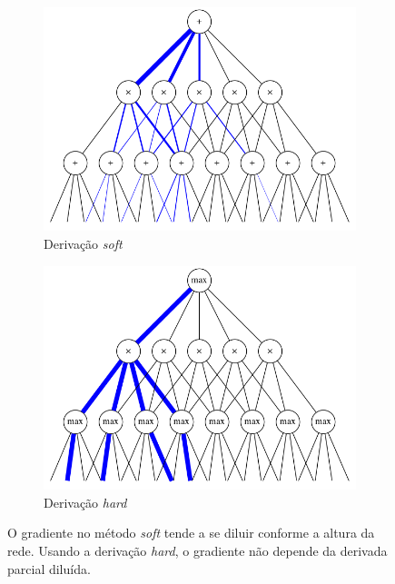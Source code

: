 \documentclass[12pt]{article}
\theoremstyle{plain}
\numberwithin{equation}{section}
\begin{document}
\begin{figure}[h]
  \begin{subfigure}{.5\textwidth}
    \centering\includegraphics[scale=0.375]{graphs/softgrad.png}
    \caption{Derivação \textit{soft}}
  \end{subfigure}
  \begin{subfigure}{.5\textwidth}
    \centering\includegraphics[scale=0.375]{graphs/hardgrad.png}
    \caption{Derivação \textit{hard}}
  \end{subfigure}
  \captionsetup{justification=raggedright}
  \caption{O gradiente no método \textit{soft} tende a se diluir conforme a altura da rede. Usando
  a derivação \textit{hard}, o gradiente não depende da derivada parcial diluída.}
\end{figure}
\end{document}
